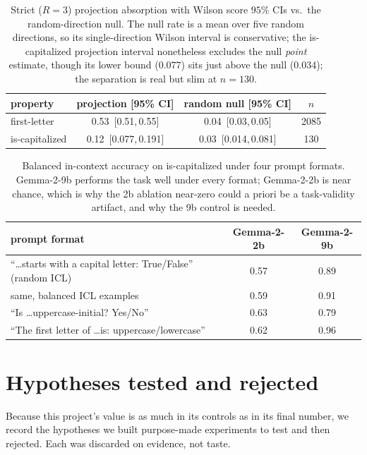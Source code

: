 \documentclass[11pt]{article}
\newcommand{\iscap}{\textsf{is-capitalized}}
\theoremstyle{definition}
\begin{document}
\begin{table}[h]
  \centering
  \caption{Strict ($R{=}3$) projection absorption with Wilson score $95\%$ CIs vs.\ the random-direction
  null. The null rate is a mean over five random directions, so its single-direction Wilson interval is
  conservative; the \iscap{} projection interval nonetheless excludes the null \emph{point} estimate, though
  its lower bound ($0.077$) sits just above the null ($0.034$); the separation is real but slim at
  $n{=}130$.}
  \label{tab:proj-ci}
  \begin{tabular}{lccc}
    \toprule
    property & projection [95\% CI] & random null [95\% CI] & $n$ \\
    \midrule
    first-letter & 0.53\ [0.51,\,0.55] & 0.04\ [0.03,\,0.05] & 2085 \\
    \iscap{}     & 0.12\ [0.077,\,0.191] & 0.03\ [0.014,\,0.081] & 130 \\
    \bottomrule
  \end{tabular}
\end{table}

\begin{table}[h]
  \centering
  \caption{Balanced in-context accuracy on \iscap{} under four prompt formats. Gemma-2-9b performs the task
  well under every format; Gemma-2-2b is near chance, which is why the 2b ablation near-zero could a priori be a
  task-validity artifact, and why the 9b control is needed.}\label{tab:acc}
  \small
  \begin{tabular}{lcc}
    \toprule
    prompt format & Gemma-2-2b & Gemma-2-9b \\
    \midrule
    ``\dots starts with a capital letter: True/False'' (random ICL) & 0.57 & 0.89 \\
    same, balanced ICL examples & 0.59 & 0.91 \\
    ``Is \dots uppercase-initial? Yes/No'' & 0.63 & 0.79 \\
    ``The first letter of \dots is: uppercase/lowercase'' & 0.62 & 0.96 \\
    \bottomrule
  \end{tabular}
\end{table}

\section{Hypotheses tested and rejected}\label{app:rejected}
Because this project's value is as much in its controls as in its final number, we record the hypotheses we
built purpose-made experiments to test and then rejected. Each was discarded on evidence, not taste.
\end{document}
